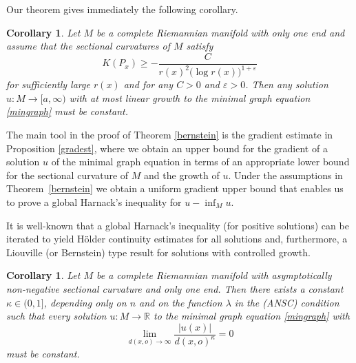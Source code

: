 \documentclass[10pt,a4paper,reqno]{amsart}
\newcommand{\ve}{\varepsilon}
\newcommand{\R}{\mathbb{R}}
\numberwithin{equation}{section}
\theoremstyle{plain}
\newtheorem{cor}[thm]{Corollary}
\theoremstyle{definition}
\begin{document}
Our theorem gives immediately the following corollary.
\begin{cor}\label{1st-cor}
 Let $M$ be a complete Riemannian manifold with only one end and assume that the sectional curvatures of $M$ satisfy
  \begin{equation*}
   K(P_x) \ge -\frac{C}{r(x)^2 \big(\log r(x)\big)^{1+\ve}}
  \end{equation*}
for sufficiently large $r(x)$ and for any $C>0$ and $\ve>0$.
Then any solution $u\colon M\to [a,\infty)$ with at most linear growth to the minimal graph 
equation \eqref{mingraph} must be constant.
\end{cor} 
The main tool in the proof of Theorem \ref{bernstein} is the gradient estimate in Proposition \ref{gradest},
where we obtain an upper bound for the gradient of a solution $u$ of the minimal graph equation in terms of an appropriate lower bound for 
the sectional curvature of $M$ and the growth of $u$. Under the assumptions in Theorem~\ref{bernstein}  we obtain a uniform gradient upper bound that enables us to prove a global Harnack's inequality for $u-\inf_M u$.

It is well-known that a global Harnack's inequality (for positive solutions) can be iterated to yield H\"older continuity estimates for all solutions and, furthermore, a Liouville (or Bernstein) type result for solutions with controlled growth. 
\begin{cor}\label{2nd-cor} 
Let $M$ be a complete Riemannian manifold with asymptotically non-negative sectional curvature and only one end.
 Then there exists a constant $\kappa\in (0,1]$, depending only on $n$ and on the function $\lambda$ in the (ANSC) 
condition such that every solution $u\colon M\to\R$ to the minimal graph equation
\eqref{mingraph} with
\[
\lim_{d(x,o)\to\infty}\frac{|u(x)|}{d(x,o)^{\kappa}}=0
\]
must be constant.
\end{cor}
\end{document}
